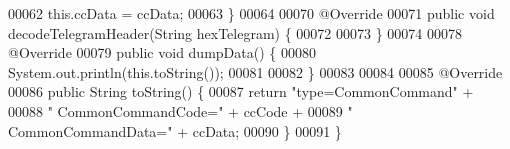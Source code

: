 \begin{DoxyCode}
00062         this.ccData = ccData;
00063     \}
00064 
00070     @Override
00071     \textcolor{keyword}{public} \textcolor{keywordtype}{void} decodeTelegramHeader(String hexTelegram) \{
00072 
00073     \}
00074 
00078     @Override
00079     \textcolor{keyword}{public} \textcolor{keywordtype}{void} dumpData() \{
00080         System.out.println(this.toString());
00081 
00082     \}
00083 
00084 
00085     @Override
00086     \textcolor{keyword}{public} String toString() \{
00087         \textcolor{keywordflow}{return} \textcolor{stringliteral}{"type=CommonCommand"} +
00088                 \textcolor{stringliteral}{" CommonCommandCode="} + ccCode +
00089                 \textcolor{stringliteral}{" CommonCommandData="} + ccData;
00090     \}
00091 \}
\end{DoxyCode}
